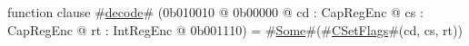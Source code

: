 function clause #\hyperref[zdecode]{decode}# (0b010010 @ 0b00000 @ cd : CapRegEnc @ cs : CapRegEnc @ rt : IntRegEnc @ 0b001110) = #\hyperref[zSome]{Some}#(#\hyperref[zCSetFlags]{CSetFlags}#(cd, cs, rt))
